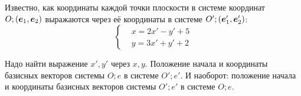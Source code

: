 \documentclass[a4paper,12pt]{article}
\begin{document}
  
  \begin{problem}[4.5]
    Известно, как координаты каждой точки плоскости в системе координат $O; (\boldsymbol e_1, \boldsymbol e_2)$ выражаются через её координаты в системе $O'; (\boldsymbol e_1', \boldsymbol e_2')$:
    \begin{equation}\label{eq:sys-in-4.5}
      \left\{
        \begin{aligned}
          &x = 2x' - y' + 5\\
          &y = 3x' + y' + 2
        \end{aligned}
      \right.
    \end{equation}
    
    Надо найти выражение $x', y'$ через $x, y$.
    Положение начала и координаты базисных векторов системы $O; e$ в системе $O'; e'$.
    И наоборот: положение начала и координаты базисных векторов системы $O'; e'$ в системе $O; e$.
  \end{problem}
  
\end{document}
